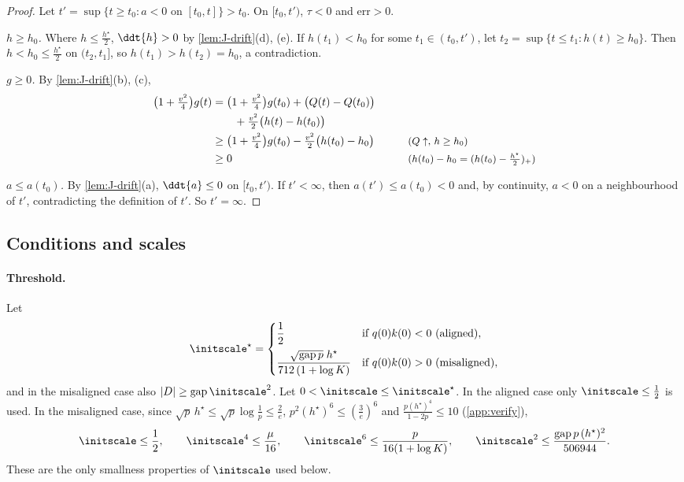\begin{proof}
Let $t'=\sup\{t\ge t_0:a<0\text{ on }[t_0,t]\}>t_0$. On $[t_0,t')$, $\tau<0$ and $\mathrm{err}>0$.

\emph{$h\ge h_0$.} Where $h\le\frac{h^\star}{2}$, $\ddt{h}>0$ by \cref{lem:J-drift}(d), (e). If $h(t_1)<h_0$ for some $t_1\in(t_0,t')$, let
$t_2=\sup\{t\le t_1:h(t)\ge h_0\}$. Then $h<h_0\le\frac{h^\star}{2}$ on $(t_2,t_1]$, so $h(t_1)>h(t_2)=h_0$, a contradiction.

\emph{$g\ge0$.} By \cref{lem:J-drift}(b), (c),
\begin{alignat*}{2}
 \bigl(1+\tfrac{v^2}{4}\bigr)g(t)&=\bigl(1+\tfrac{v^2}{4}\bigr)g(t_0)+\bigl(Q(t)-Q(t_0)\bigr) &\qquad&\\
 &\qquad+\tfrac{v^2}{2}\bigl(h(t)-h(t_0)\bigr)\\
 &\ge\bigl(1+\tfrac{v^2}{4}\bigr)g(t_0)-\tfrac{v^2}{2}\bigl(h(t_0)-h_0\bigr) && \text{\small($Q\uparrow$, $h\ge h_0$)}\\
 &\ge0 && \text{\small($h(t_0)-h_0=(h(t_0)-\tfrac{h^\star}{2})_+$)}
\end{alignat*}

\emph{$a\le a(t_0)$.} By \cref{lem:J-drift}(a), $\ddt{a}\le0$ on $[t_0,t')$. If $t'<\infty$, then $a(t')\le a(t_0)<0$ and, by continuity, $a<0$ on a
neighbourhood of $t'$, contradicting the definition of $t'$. So $t'=\infty$.
\end{proof}

\subsection{Conditions and scales}
\label{app:J-constants}

\paragraph{Threshold.} Let
\[
 \initscale^\star=\begin{cases}\dfrac{1}{2}&\text{if }q(0)k(0)<0\ \text{(aligned)},\\[8pt]
 \dfrac{\sqrt{\mathrm{gap}\,p}\;h^\star}{712\,(1+\log K)}&\text{if }q(0)k(0)>0\ \text{(misaligned)},\end{cases}
\]
and in the misaligned case also $|D|\ge\mathrm{gap}\,\initscale^2$. Let $0<\initscale\le\initscale^\star$. In the aligned case only $\initscale\le\frac{1}{2}$ is used.
In the misaligned case, since $\sqrt p\,h^\star\le\sqrt p\log\frac{1}{p}\le\frac{2}{e}$, $p^2(h^\star)^6\le(\frac{3}{e})^6$ and $\frac{p(h^\star)^4}{1-2p}\le10$
(\cref{app:verify}),
\begin{equation}
 \initscale\le\frac{1}{2},\qquad \initscale^4\le\frac{\mu}{16},\qquad \initscale^6\le\frac{p}{16(1+\log K)},\qquad
 \initscale^2\le\frac{\mathrm{gap}\,p\,(h^\star)^2}{506944}.
 \label{eq:J-eps}
\end{equation}
These are the only smallness properties of $\initscale$ used below.


